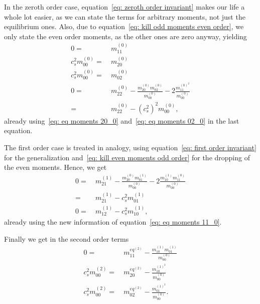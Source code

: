 In the zeroth order case, equation~\eqref{eq: zeroth order invariant} makes our life a whole lot easier, as we can state the terms for arbitrary moments, not just the equilibrium ones.
Also, due to equation~\eqref{eq: kill odd moments even order}, we only state the even order moments, as the other ones are zero anyway, yielding
\begin{align}
  \label{eq: eq moments 11_0}
  0 = &\ m_{11}^{(0)}
  \\
  \label{eq: eq moments 20_0}
  c_s^2 m_{00}^{(0)} = &\ m_{20}^{(0)}
  \\
  \label{eq: eq moments 02_0}
  c_s^2 m_{00}^{(0)} = &\ m_{02}^{(0)}
  \\
  \label{eq: eq moments 22_0}
  0 = &\ m_{22}^{(0)} - \frac{ m_{20}^{(0)} m_{02}^{(0)} }{m_{00}^{(0)}} - 2\frac{ m_{11}^{{(0)}^2}}{m_{00}^{(0)}}
  \\ = &\ m_{22}^{(0)} - {(c_s^2)}^2 m_{00}^{(0)},
\end{align}
already using~\eqref{eq: eq moments 20_0} and~\eqref{eq: eq moments 02_0} in the last equation.

The first order case is treated in analogy, using equation~\eqref{eq: first order invariant} for the generalization and~\eqref{eq: kill even moments odd order} for the dropping of the even moments.
Hence, we get
\begin{align}\nonumber
  0 = &\ m_{21}^{(1)}
  - \frac{m_{20}^{(0)} m_{01}^{(1)}}{m_{00}^{(0)}}
  - 2\frac{m_{10}^{(1)} m_{11}^{(0)}}{m_{00}^{(0)}}
  \\
  \label{eq: eq moments 21_1}
  = &\ m_{21}^{(1)}
  - c_s^2 m_{01}^{(1)}
  \\
  \label{eq: eq moments 12_1}
  0 = &\ m_{12}^{(1)}
  - c_s^2 m_{10}^{(1)},
\end{align}
already using the new information of equation~\eqref{eq: eq moments 11_0}.

Finally we get in the second order terms
\begin{align}
    \label{eq: eq moments 11_2}
    0 =&\ m_{11}^{eq^{(2)}} - \frac{ m_{10}^{(1)} m_{01}^{(1)} }{ m_{00}^{(0)}}
    \\
    \label{eq: eq moments 20_2}
    c_s^2 m_{00}^{(2)} =&\ m_{20}^{eq^{(2)}} - \frac{ m_{10}^{{(1)}^2}}{m_{00}^{(0)}}
    \\
    \label{eq: eq moments 02_2}
    c_s^2 m_{00}^{(2)} =&\ m_{02}^{eq^{(2)}} - \frac{ m_{01}^{{(1)}^2}}{m_{00}^{(0)}} .
\end{align}
